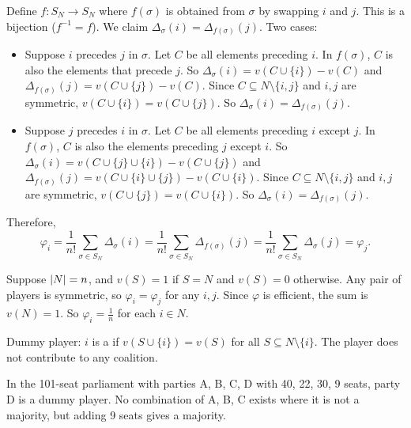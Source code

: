 \documentclass[12pt,letterpaper]{report}
\begin{document}
\begin{thmproof}
  Define $f \colon S_N \to S_N$ where $f(\sigma)$ is obtained from $\sigma$ by swapping $i$ and $j$.
  This is a bijection ($f^{-1} = f$).
  We claim $\Delta_\sigma(i) = \Delta_{f(\sigma)}(j)$.
  Two cases:
  \begin{itemize}
    \item
    Suppose $i$ precedes $j$ in $\sigma$.
    Let $C$ be all elements preceding $i$.
    In $f(\sigma)$, $C$ is also the elements that precede $j$.
    So $\Delta_\sigma(i) = v(C \cup \{i\}) - v(C)$ and
    $\Delta_{f(\sigma)}(j) = v(C \cup \{j\}) - v(C)$.
    Since $C \subseteq N \setminus \{i, j\}$ and $i, j$ are symmetric,
    $v(C \cup \{i\}) = v(C \cup \{j\})$.
    So $\Delta_\sigma(i) = \Delta_{f(\sigma)}(j)$.
    \item
    Suppose $j$ precedes $i$ in $\sigma$.
    Let $C$ be all elements preceding $i$ except $j$.
    In $f(\sigma)$, $C$ is also the elements preceding $j$ except $i$.
    So $\Delta_\sigma(i) = v(C \cup \{j\} \cup \{i\}) - v(C \cup \{j\})$ and
    $\Delta_{f(\sigma)}(j) = v(C \cup \{i\} \cup \{j\}) - v(C \cup \{i\})$.
    Since $C \subseteq N \setminus \{i, j\}$ and $i, j$ are symmetric,
    $v(C \cup \{j\}) = v(C \cup \{i\})$.
    So $\Delta_\sigma(i) = \Delta_{f(\sigma)}(j)$.
  \end{itemize}
  Therefore,
  \[
    \varphi_i
      = \frac{1}{n!} \sum_{\sigma \in S_N} \Delta_\sigma(i)
      = \frac{1}{n!} \sum_{\sigma \in S_N} \Delta_{f(\sigma)}(j)
      = \frac{1}{n!} \sum_{\sigma \in S_N} \Delta_\sigma(j)
      = \varphi_j.
  \]
\end{thmproof}

\begin{ex}
  Suppose $\lvert N\rvert = n$, and $v(S) = 1$ if $S = N$ and $v(S) = 0$ otherwise.
  Any pair of players is symmetric, so $\varphi_i = \varphi_j$ for any $i, j$.
  Since $\varphi$ is efficient, the sum is $v(N) = 1$.
  So $\varphi_i = \frac{1}{n}$ for each $i \in N$.
\end{ex}

\begin{enumcase}[start=3]
  \item
  Dummy player: $i$ is a  if $v(S \cup \{i\}) = v(S)$ for all
  $S \subseteq N \setminus \{i\}$.
  The player does not contribute to any coalition.
\end{enumcase}

\begin{ex}
  In the 101-seat parliament with parties A, B, C, D with 40, 22, 30, 9 seats, party D is a dummy
  player.
  No combination of A, B, C exists where it is not a majority, but adding 9 seats gives a majority.
\end{ex}
\end{document}
